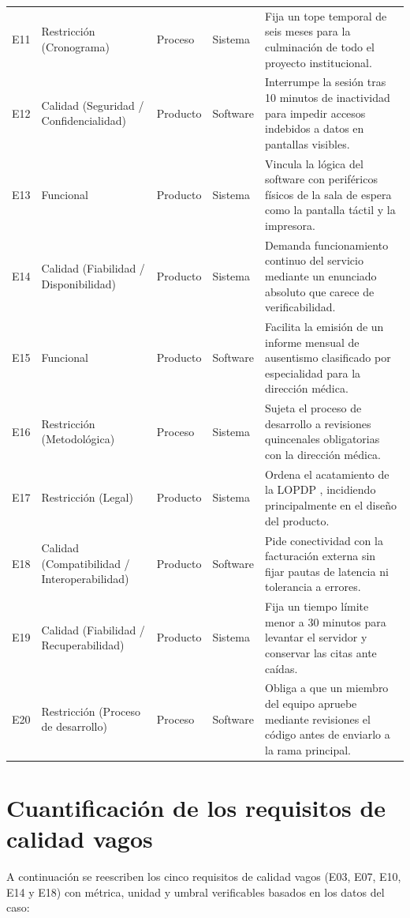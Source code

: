 \documentclass[10pt,a4paper]{article}
\begin{document}
\begin{longtable}{@{}p{0.8cm}p{3.4cm}p{1.6cm}p{1.5cm}p{8.0cm}@{}}
E11 & Restricci\'on (Cronograma) & Proceso & Sistema & Fija un tope temporal de seis meses para la culminaci\'on de todo el proyecto institucional. \\
E12 & Calidad (Seguridad / Confidencialidad) & Producto & Software & Interrumpe la sesi\'on tras 10 minutos de inactividad para impedir accesos indebidos a datos en pantallas visibles. \\
E13 & Funcional & Producto & Sistema & Vincula la l\'ogica del software con perif\'ericos f\'isicos de la sala de espera como la pantalla t\'actil y la impresora. \\
E14 & Calidad (Fiabilidad / Disponibilidad) & Producto & Sistema & Demanda funcionamiento continuo del servicio mediante un enunciado absoluto que carece de verificabilidad. \\
E15 & Funcional & Producto & Software & Facilita la emisi\'on de un informe mensual de ausentismo clasificado por especialidad para la direcci\'on m\'edica. \\
E16 & Restricci\'on (Metodol\'ogica) & Proceso & Sistema & Sujeta el proceso de desarrollo a revisiones quincenales obligatorias con la direcci\'on m\'edica. \\
E17 & Restricci\'on (Legal) & Producto & Sistema & Ordena el acatamiento de la LOPDP \cite{lopdp2021}, incidiendo principalmente en el dise\~no del producto. \\
E18 & Calidad (Compatibilidad / Interoperabilidad) & Producto & Software & Pide conectividad con la facturaci\'on externa sin fijar pautas de latencia ni tolerancia a errores. \\
E19 & Calidad (Fiabilidad / Recuperabilidad) & Producto & Sistema & Fija un tiempo l\'imite menor a 30 minutos para levantar el servidor y conservar las citas ante ca\'idas. \\
E20 & Restricci\'on (Proceso de desarrollo) & Proceso & Software & Obliga a que un miembro del equipo apruebe mediante revisiones el c\'odigo antes de enviarlo a la rama principal. \\
\end{longtable}
\normalsize

\section{Cuantificaci\'on de los requisitos de calidad vagos}
A continuaci\'on se reescriben los cinco requisitos de calidad vagos (E03, E07, E10, E14 y E18) con m\'etrica, unidad y umbral verificables basados en los datos del caso:
\end{document}
